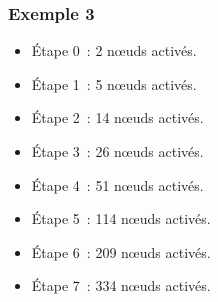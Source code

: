 \documentclass[12pt, handout]{beamer}
\begin{document}
\begin{frame}
\frametitle{Exemple 3}

\begin{itemize}
 \item Étape 0~: 2  n\oe{}uds activés.
 \item Étape 1~: 5  n\oe{}uds activés.
 \item Étape 2~: 14 n\oe{}uds activés.
 \item Étape 3~: 26 n\oe{}uds activés.
 \item Étape 4~: 51 n\oe{}uds activés.
 \item Étape 5~: 114 n\oe{}uds activés.
 \item Étape 6~: 209 n\oe{}uds activés.
 \item Étape 7~: 334 n\oe{}uds activés.
\end{itemize}


% 
%   

\end{frame}
\end{document}
